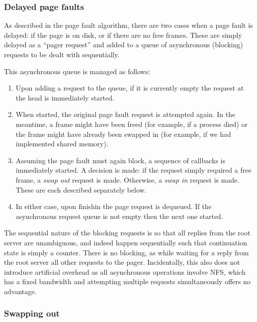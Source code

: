\documentclass[12pt,english]{article}
\begin{document}
\subsubsection{Delayed page faults}

As described in the page fault algorithm, there are two cases when a page fault is delayed: if the page is on disk, or if there are no free frames.  These are simply delayed as a ``pager request'' and added to a queue of asynchronous (blocking) requests to be dealt with sequentially.

This asynchronous queue is managed as follows:
\begin{enumerate}
\item Upon adding a request to the queue, if it is currently empty the request at the head is immediately started.
\item When started, the original page fault request is attempted again.  In the meantime, a frame might have been freed (for example, if a process died) or the frame might have already been swapped in (for example, if we had implemented shared memory).
\item Assuming the page fault must again block, a sequence of callbacks is immediately started.  A decision is made: if the request simply required a free frame, a \emph{swap out} request is made.  Otherwise, a \emph{swap in} request is made.  These are each described separately below.
\item In either case, upon finishin the page request is dequeued.  If the asynchronous request queue is not empty then the next one started.
\end{enumerate}

The sequential nature of the blocking requests is so that all replies from the root server are unambiguous, and indeed happen sequentially such that continuation state is simply a counter.  There is no blocking, as while waiting for a reply from the root server all other requests to the pager.  Incidentally, this also does not introduce artificial overhead as all asynchronous operations involve NFS, which has a fixed bandwidth and attempting multiple requests simultaneously offers no advantage.

\subsubsection{Swapping out}
\end{document}
